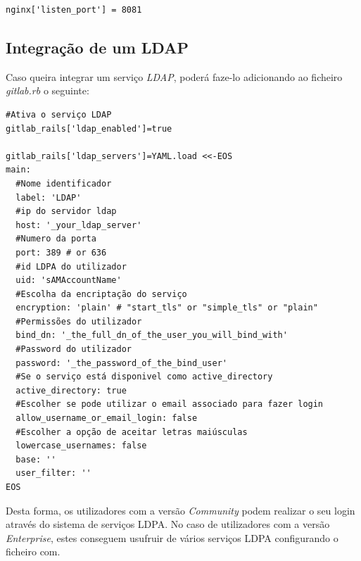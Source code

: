 \documentclass[12pt,a4paper]{article}
\begin{document}
\begin{verbatim}
nginx['listen_port'] = 8081
\end{verbatim}

\iffalse
\subsection{Integração de um LDAP}
\par Caso queira integrar um serviço \emph{LDAP}, poderá faze-lo adicionando ao ficheiro \emph{gitlab.rb} o seguinte: 
\begin{verbatim}
#Ativa o serviço LDAP
gitlab_rails['ldap_enabled']=true

gitlab_rails['ldap_servers']=YAML.load <<-EOS
main:
  #Nome identificador
  label: 'LDAP'
  #ip do servidor ldap
  host: '_your_ldap_server'
  #Numero da porta
  port: 389 # or 636
  #id LDPA do utilizador
  uid: 'sAMAccountName'
  #Escolha da encriptação do serviço
  encryption: 'plain' # "start_tls" or "simple_tls" or "plain"
  #Permissões do utilizador
  bind_dn: '_the_full_dn_of_the_user_you_will_bind_with'
  #Password do utilizador
  password: '_the_password_of_the_bind_user'
  #Se o serviço está disponivel como active_directory
  active_directory: true
  #Escolher se pode utilizar o email associado para fazer login
  allow_username_or_email_login: false
  #Escolher a opção de aceitar letras maiúsculas
  lowercase_usernames: false
  base: ''
  user_filter: ''
EOS
\end{verbatim}
Desta forma, os utilizadores com a versão \emph{Community} podem realizar o seu login através do sistema de serviços LDPA.
\newline
No caso de utilizadores com a versão \emph{Enterprise}, estes conseguem usufruir de vários serviços LDPA configurando o ficheiro com.
\end{document}
